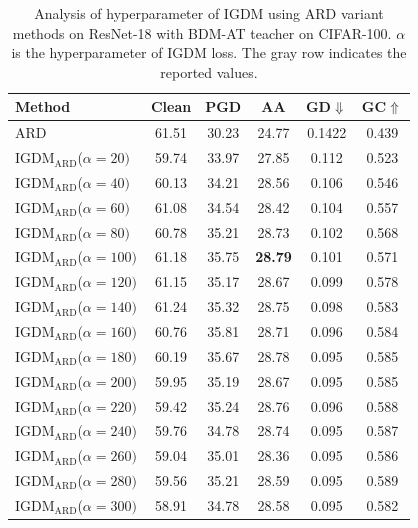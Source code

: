 \documentclass{article} %
\begin{document}
\begin{table}[h]
 \centering
 \caption{Analysis of hyperparameter of IGDM using ARD variant methods on ResNet-18 with BDM-AT teacher on CIFAR-100. $\alpha$ is the hyperparameter of IGDM loss. The gray row indicates the reported values.}
 \setlength{\tabcolsep}{14pt}
 \begin{tabular}{lccccc}
 \toprule

 Method& Clean & PGD & AA & GD$\Downarrow$ & GC$\Uparrow$ \\
\midrule
 ARD \citep{ard}& 61.51 & 30.23 & 24.77 & 0.1422 & 0.439 
\\
 IGDM$_\text{ARD}$($\alpha=20)$  & 59.74 & 33.97 & 27.85 & 0.112 & 0.523
\\
 IGDM$_\text{ARD}$($\alpha=40)$ & 60.13& 34.21& 28.56& 0.106 & 0.546
\\
 IGDM$_\text{ARD}$($\alpha=60)$& 61.08& 34.54& 28.42& 0.104& 0.557\\
 IGDM$_\text{ARD}$($\alpha=80)$& 60.78& 35.21& 28.73& 0.102& 0.568\\
 \rowcolor{gray!30}
 IGDM$_\text{ARD}$($\alpha=100)$& 61.18& 35.75& \textbf{28.79}& 0.101& 0.571\\
 IGDM$_\text{ARD}$($\alpha=120)$& 61.15& 35.17& 28.67& 0.099& 0.578\\
 IGDM$_\text{ARD}$($\alpha=140)$& 61.24& 35.32& 28.75& 0.098& 0.583\\
 IGDM$_\text{ARD}$($\alpha=160)$& 60.76& 35.81& 28.71& 0.096 & 0.584\\
 IGDM$_\text{ARD}$($\alpha=180)$& 60.19& 35.67& 28.78& 0.095 & 0.585\\
 IGDM$_\text{ARD}$($\alpha=200)$& 59.95& 35.19 & 28.67& 0.095 & 0.585
\\
 IGDM$_\text{ARD}$($\alpha=220)$& 59.42& 35.24& 28.76& 0.096 & 0.588\\
 IGDM$_\text{ARD}$($\alpha=240)$& 59.76& 34.78& 28.74& 0.095 & 0.587\\
 IGDM$_\text{ARD}$($\alpha=260)$& 59.04 & 35.01 & 28.36 & 0.095 & 0.586
\\
 IGDM$_\text{ARD}$($\alpha=280)$& 59.56 & 35.21 & 28.59 & 0.095 & 0.589
\\
 IGDM$_\text{ARD}$($\alpha=300)$& 58.91 & 34.78 & 28.58 & 0.095 & 0.582\\
\bottomrule
 \end{tabular}

 \label{tab:supp_hyper_ard}
\end{table}
\end{document}
